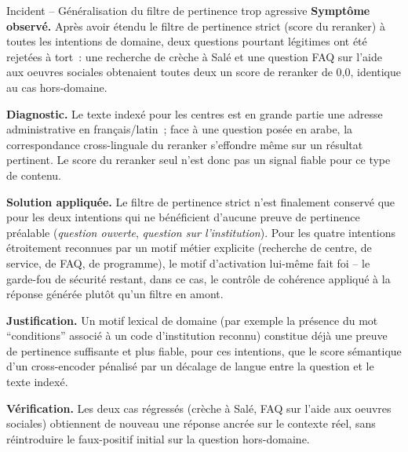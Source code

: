 \begin{probbox}{Incident -- Généralisation du filtre de pertinence trop agressive}
\textbf{Symptôme observé.} Après avoir étendu le filtre de pertinence strict (score du reranker) à toutes les intentions de domaine, deux questions pourtant légitimes ont été rejetées à tort~: une recherche de crèche à Salé et une question FAQ sur l'aide aux oeuvres sociales obtenaient toutes deux un score de reranker de 0,0, identique au cas hors-domaine.

\textbf{Diagnostic.} Le texte indexé pour les centres est en grande partie une adresse administrative en français/latin~; face à une question posée en arabe, la correspondance cross-linguale du reranker s'effondre même sur un résultat pertinent. Le score du reranker seul n'est donc pas un signal fiable pour ce type de contenu.

\textbf{Solution appliquée.} Le filtre de pertinence strict n'est finalement conservé que pour les deux intentions qui ne bénéficient d'aucune preuve de pertinence préalable (\emph{question ouverte}, \emph{question sur l'institution}). Pour les quatre intentions étroitement reconnues par un motif métier explicite (recherche de centre, de service, de FAQ, de programme), le motif d'activation lui-même fait foi -- le garde-fou de sécurité restant, dans ce cas, le contrôle de cohérence appliqué à la réponse générée plutôt qu'un filtre en amont.

\textbf{Justification.} Un motif lexical de domaine (par exemple la présence du mot ``conditions'' associé à un code d'institution reconnu) constitue déjà une preuve de pertinence suffisante et plus fiable, pour ces intentions, que le score sémantique d'un cross-encoder pénalisé par un décalage de langue entre la question et le texte indexé.

\textbf{Vérification.} Les deux cas régressés (crèche à Salé, FAQ sur l'aide aux oeuvres sociales) obtiennent de nouveau une réponse ancrée sur le contexte réel, sans réintroduire le faux-positif initial sur la question hors-domaine.
\end{probbox}

